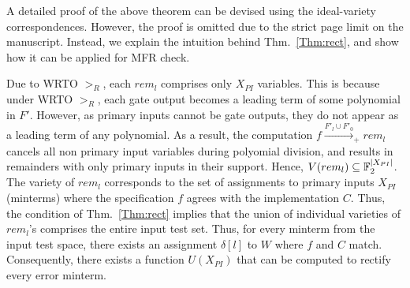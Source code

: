 
A detailed proof of the above theorem can be devised using the
ideal-variety correspondences. However, the proof is omitted due to
the strict page  limit on the manuscript. Instead, we explain the
intuition behind Thm.~\ref{Thm:rect}, and show how it can be applied
for MFR check.

Due to WRTO $>_R$, each $rem_l$ comprises only $X_{PI}$
variables. This is because under WRTO $>_R$, each gate output becomes
a leading term of some polynomial in $F'$. However, as primary inputs 
cannot be gate outputs, they do not appear as a leading term
of any polynomial. As a result, the computation
$f\xrightarrow{F'_l\cup F'_0}_+rem_l$ cancels all non primary input
variables during polyomial division, and results in remainders with
only primary inputs in their support. Hence, $V(rem_l) \subseteq
{\mathbb{F}}_{2}^{|X_{PI}|}$. The variety of  $rem_l$  corresponds to the set of
assignments to primary inputs $X_{PI}$ (minterms) where the
specification $f$ agrees with the implementation $C$. Thus, the
condition of Thm.~\ref{Thm:rect} implies that the union of individual
varieties of $rem_l$'s comprises the entire input test set. Thus, for
every minterm from the input test space, there exists an assignment
$\delta[l]$ to $W$ where $f$ and $C$ match.  Consequently, there
exists a function $U(X_{PI})$ that can be computed to rectify every
error minterm.  


